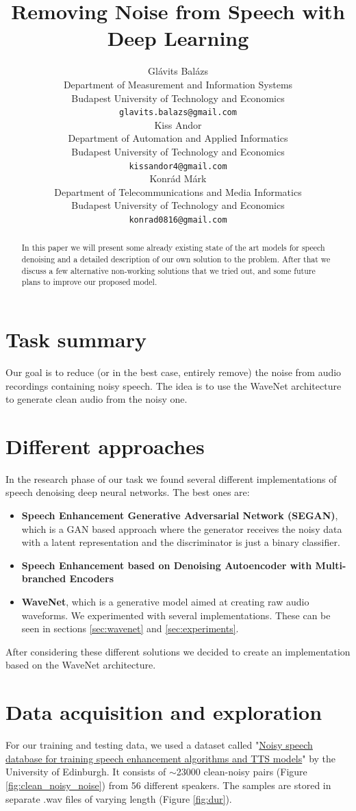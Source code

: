\documentclass{article}
\title{Removing Noise from Speech with Deep Learning}
\author{
	Glávits Balázs \\
	Department of Measurement and Information Systems\\
	Budapest University of Technology and Economics\\
	\texttt{glavits.balazs@gmail.com} \\
	 \And
	Kiss Andor \\
	Department of Automation and Applied Informatics\\
	Budapest University of Technology and Economics\\
	\texttt{kissandor4@gmail.com} \\	 
	 \And
	Konrád Márk \\
	Department of Telecommunications and Media Informatics\\
	Budapest University of Technology and Economics\\
	\texttt{konrad0816@gmail.com} \\
}
\begin{document}
	
	\maketitle
	
	\begin{abstract}
	In this paper we will present some already existing state of the art models for speech denoising and a detailed description of our own solution to the problem.  After that we discuss a few alternative non-working solutions that we tried out, and some future plans to improve our proposed model.

	\end{abstract}
	\newpage
	\section{Task summary}
	\label{sec:summary}
		Our goal is to reduce (or in the best case, entirely remove) the noise from audio recordings containing noisy speech. The idea is to use the WaveNet\cite{wavenet} architecture to generate clean audio from the noisy one.
		
	\section{Different approaches}
	In the research phase of our task we found several different implementations of speech denoising deep neural networks. The best ones are:
	\begin{itemize}
		\item \textbf{Speech Enhancement Generative Adversarial Network (SEGAN)}\cite{pascual2017segan}, which is a GAN based approach where the generator receives the noisy data with a latent representation and the discriminator is just a binary classifier.
		\item \textbf{Speech Enhancement based on Denoising Autoencoder with Multi-branched Encoders
		}\cite{yu2020speech}
		\item \textbf{WaveNet}\cite{wavenet}, which is a generative model aimed at creating raw audio waveforms. We experimented with several implementations. These can be seen in sections \ref{sec:wavenet} and \ref{sec:experiments}.
	\end{itemize}

	After considering these different solutions we decided to create an implementation based on the WaveNet architecture.
		
	\section{Data acquisition and exploration}
	For our training and testing data, we used a dataset called "\href{https://datashare.is.ed.ac.uk/handle/10283/2791}{Noisy speech database for training speech enhancement algorithms and TTS models}"\cite{dataset} by the University of Edinburgh. It consists of $\sim$23000 clean-noisy pairs (Figure \ref{fig:clean_noisy_noise}) from 56 different speakers. 
	The samples are stored in separate .wav files of varying length (Figure \ref{fig:dur}).  
\end{document}
